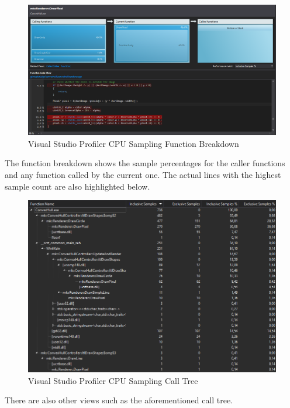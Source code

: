 \begin{figure}[htbp]
\includegraphics[scale = 0.225]{img/VisFunctionBreakdown.PNG}
\caption{Visual Studio Profiler CPU Sampling Function Breakdown}
\label{fig:VisualStudioProfilerSamplingFunctionBreakdown}
\end{figure}

The function breakdown shows the sample percentages for the caller functions and any function called by the current one.
The actual lines with the highest sample count are also highlighted below.

\begin{figure}[htbp]
\includegraphics[scale = 0.34]{img/VisCallTree.PNG}
\caption{Visual Studio Profiler CPU Sampling Call Tree}
\label{fig:VisualStudioProfilerSamplingCallTree}
\end{figure}

There are also other views such as the aforementioned call tree.

